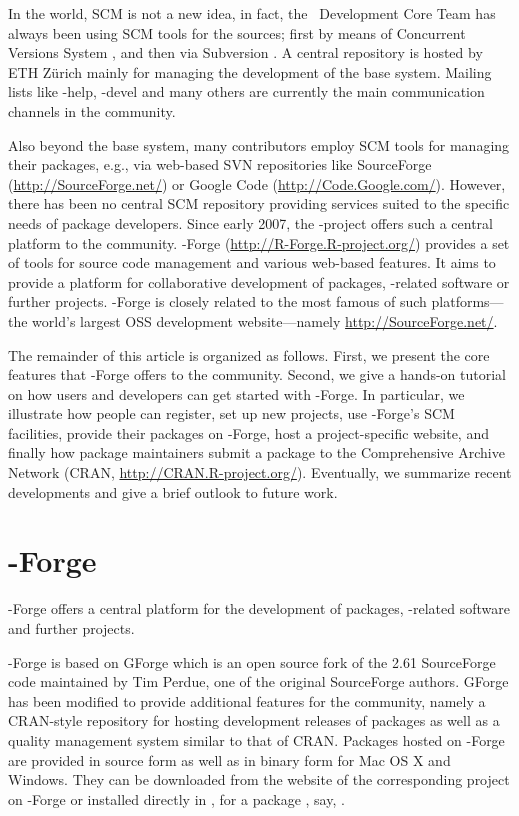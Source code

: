 In the \R{} world, SCM is not a new idea, in fact, the \R{}~Development
Core Team has always been using SCM tools for the \R{} sources; first by means of
Concurrent Versions System \citep[CVS, see][]{forge:Cederqvist:2006},
and then via Subversion \citep[SVN, see][]{forge:Pilato+Collins-Sussman+Fitzpatrick:2004}.
A central repository is hosted by ETH Z\"urich mainly for
managing the development of the base \R{} system. Mailing lists like
\R{}-help, \R{}-devel and many others are currently the main communication
channels in the \R{} community.

Also beyond the base system, many \R{} contributors employ
SCM tools for managing their \R{} packages, e.g., via web-based
SVN repositories like SourceForge (\url{http://SourceForge.net/})
or Google Code (\url{http://Code.Google.com/}). However, there has been
no central SCM repository providing services suited to the specific
needs of \R{} package developers.
Since early 2007, the \R{}-project offers such a central platform to the \R{}
community. \R{}-Forge (\url{http://R-Forge.R-project.org/}) provides a set
of tools for source code management and various web-based
features. It aims to provide a platform for collaborative development of
\R{} packages, \R{}-related software or further projects. \R{}-Forge is
closely related to the most famous of such platforms---the 
world's largest OSS development website---namely
\url{http://SourceForge.net/}.

The remainder of this article is organized as follows. First, we
present the core 
features that \R{}-Forge offers to the \R{} community. Second, we
give a hands-on tutorial on how users and developers can get started with 
\R{}-Forge. In particular, we illustrate how people
can register, set up new projects, use \R{}-Forge's SCM
facilities, provide their packages on \R{}-Forge, host a
project-specific website, and 
finally how package maintainers submit a package to the Comprehensive \R{}
Archive Network (CRAN, \url{http://CRAN.R-project.org/}).
Eventually, we summarize recent developments and give a brief outlook
to future work.


\section{\R{}-Forge}
\R{}-Forge offers a central platform for the development of \R{}
packages, \R{}-related software and further projects. 

\R{}-Forge is based on GForge \citep{forge:copeland_et_al:2006} which is
an open source fork of the 2.61 SourceForge code maintained by Tim
Perdue, one of the original SourceForge authors. GForge has been
modified to provide additional features for the \R{} community, namely
a CRAN-style repository for hosting development releases of \R{}
packages as well as a quality management system similar to that of
CRAN.
Packages hosted on \R{}-Forge are provided in source form as well as
in binary form for Mac OS X and Windows. They can be downloaded from the
website of the corresponding project on \R{}-Forge or installed
directly in \R{}, for a package , say,
.

